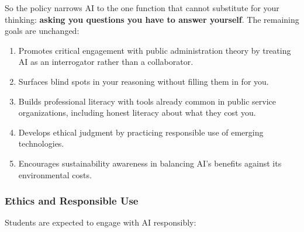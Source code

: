 \documentclass[11pt]{article}     %
\begin{document}
\vspace{0.5em}
\noindent So the policy narrows AI to the one function that cannot substitute for your thinking: \textbf{asking you questions you have to answer yourself}. The remaining goals are unchanged:

\begin{enumerate}
    \item Promotes critical engagement with public administration theory by treating AI as an interrogator rather than a collaborator.
    \item Surfaces blind spots in your reasoning without filling them in for you.
    \item Builds professional literacy with tools already common in public service organizations, including honest literacy about what they cost you.
    \item Develops ethical judgment by practicing responsible use of emerging technologies.
    \item Encourages sustainability awareness in balancing AI's benefits against its environmental costs.
\end{enumerate}

\subsubsection*{Ethics and Responsible Use}

\noindent Students are expected to engage with AI responsibly:
\end{document}
